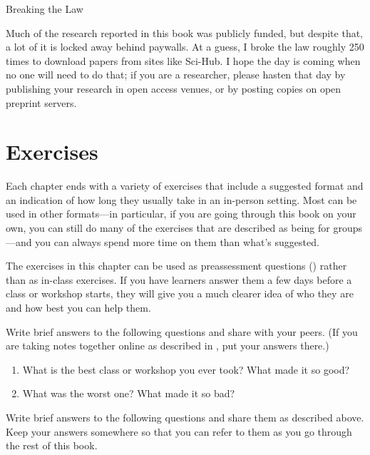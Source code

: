 \begin{callout}{Breaking the Law}

  Much of the research reported in this book was publicly funded, but
  despite that, a lot of it is locked away behind paywalls.  At a
  guess, I broke the law roughly 250 times to download papers from
  sites like Sci-Hub. I hope the day is coming when no one will need
  to do that; if you are a researcher, please hasten that day by
  publishing your research in open access venues, or by posting copies
  on open preprint servers.

\end{callout}

\section{Exercises}\label{s:intro-exercises}

Each chapter ends with a variety of exercises that include a suggested
format and an indication of how long they usually take in an in-person
setting.  Most can be used in other formats---in particular, if you
are going through this book on your own, you can still do many of the
exercises that are described as being for groups---and you can always
spend more time on them than what's suggested.

The exercises in this chapter can be used as preassessment questions
() rather than as in-class exercises.  If
you have learners answer them a few days before a class or workshop
starts, they will give you a much clearer idea of who they are and how
best you can help them.


Write brief answers to the following questions and share with your
peers.  (If you are taking notes together online as described in
, put your answers there.)

\begin{enumerate}
\item
  What is the best class or workshop you ever took? What made it so good?
\item
  What was the worst one? What made it so bad?
\end{enumerate}


Write brief answers to the following questions and share them as
described above.  Keep your answers somewhere so that you can refer to
them as you go through the rest of this book.


